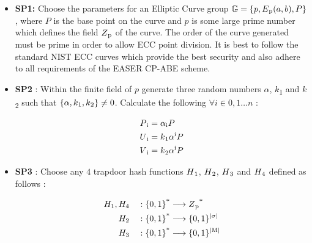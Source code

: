 \documentclass[conference]{IEEEtran}
\begin{document}
\begin{itemize}
    \item{\bf SP1:} Choose the parameters for an Elliptic Curve group $\mathbb{G} = \{p, E\textsubscript{p}(a, b), P\}$, where $P$ is the base point on the curve and $p$ is some large prime number which defines the field $Z\textsubscript{p}$ of the curve. The order of the curve generated must be prime in order to allow ECC point division. It is best to follow the standard NIST ECC curves which provide the best security and also adhere to all requirements of the EASER CP-ABE scheme.

    \item{\bf SP2} : Within the finite field of $p$ generate three random numbers $\alpha$, $k$\textsubscript{1} and $k$\textsubscript{2} such that $\{\alpha, k\textsubscript{1}, k\textsubscript{2}\} \neq0$. Calculate the following $\forall i \in 0,1\ldots  n$ :
          \begin{ceqn}
              \begin{align}
                  P\textsubscript{i} & = \alpha\textsubscript{i}P                     \\
                  U\textsubscript{i} & = k\textsubscript{1}\alpha\textsuperscript{i}P \\
                  V\textsubscript{i} & = k\textsubscript{2}\alpha\textsuperscript{i}P
              \end{align}
          \end{ceqn}

    \item{\bf SP3} : Choose any $4$ trapdoor hash functions $H\textsubscript{1}$, $H\textsubscript{2}$, $H\textsubscript{3}$ and $H\textsubscript{4}$ defined as follows :
          \begin{ceqn}
              \begin{align}
                  H_1,H_4 \quad & : \{0, 1\}\textsuperscript{*}\longrightarrow Z\textsubscript{p}\textsuperscript{*}          \\
                  H_2 \quad     & : \{0, 1\}\textsuperscript{*}\longrightarrow \{0, 1\}\textsuperscript{$\mid$$\sigma$$\mid$} \\
                  H_3 \quad     & : \{0, 1\}\textsuperscript{*}\longrightarrow \{0, 1\}\textsuperscript{$\mid$M$\mid$}
              \end{align}
          \end{ceqn}


\end{itemize}
\end{document}
